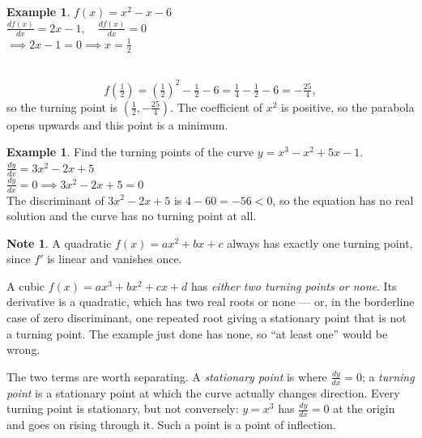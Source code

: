 \documentclass[11pt,a4paper]{article}
\theoremstyle{definition}
\newtheorem{example}[thm]{Example}
\newtheorem{note}[thm]{Note}
\begin{document}
\begin{example}
 
$f(x)=x^2-x-6$\\

$\frac{df(x)}{dx}=2x-1,\quad  \frac{df(x)}{dx}=0$\\

$\implies 2x-1=0\implies x=\frac{1}{2}$\\\\




\begin{figure}[H]
\centering
{}
\end{figure}



$$f\left(\tfrac{1}{2}\right)=\left(\tfrac{1}{2}\right)^{2}-\tfrac{1}{2}-6
=\tfrac{1}{4}-\tfrac{1}{2}-6=-\tfrac{25}{4},$$
so the turning point is $\left(\tfrac{1}{2},-\tfrac{25}{4}\right)$. The coefficient
of $x^{2}$ is positive, so the parabola opens upwards and this point is a minimum.
\end{example}
\begin{example}

Find the turning points of the curve $y=x^3-x^2+5x-1$.\\

$\frac{dy}{dx}=3x^2-2x+5$\\

$\frac{dy}{dx}=0\implies 3x^2-2x+5=0$\\

The discriminant of $3x^{2}-2x+5$ is $4-60=-56<0$, so the equation has no real
solution and the curve has no turning point at all.

\begin{note}
A quadratic $f(x)=ax^{2}+bx+c$ always has exactly one turning point, since $f'$ is
linear and vanishes once.

A cubic $f(x)=ax^{3}+bx^{2}+cx+d$ has \emph{either two turning points or none}.
Its derivative is a quadratic, which has two real roots or none --- or, in the
borderline case of zero discriminant, one repeated root giving a stationary point
that is not a turning point. The example just done has none, so ``at least one''
would be wrong.

The two terms are worth separating. A \emph{stationary point} is where
$\frac{dy}{dx}=0$; a \emph{turning point} is a stationary point at which the curve
actually changes direction. Every turning point is stationary, but not conversely:
$y=x^{3}$ has $\frac{dy}{dx}=0$ at the origin and goes on rising through it. Such
a point is a point of inflection.
\end{note}
\end{example}
\end{document}
